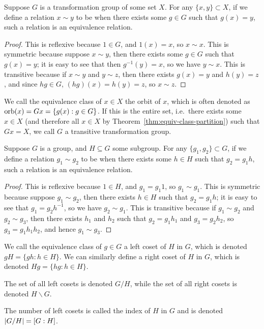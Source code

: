 \begin{proposition}
    Suppose \(G\) is a transformation group of some set \(X\).
    For any \(\{x,y\} \subset X\),
    if we define a relation \(x \sim y\) to be
    when there exists some \(g \in G\)
    such that \(g(x) = y\),
    such a relation is an equivalence relation.
\end{proposition}
\begin{proof}
    This is reflexive because \(1 \in G\),
    and \(1(x) = x\), so \(x \sim x\).
    This is symmetric because suppose \(x \sim y\),
    then there exists some \(g \in G\) such that \(g(x) = y\);
    it is easy to see that then \(g^{-1}(y) = x\),
    so we have \(y \sim x\).
    This is transitive because if \(x \sim y\) and \(y \sim z\),
    then there exists \(g(x) = y\) and \(h(y) = z\),
    and since \(hg \in G\), \((hg)(x) = h(y) = z\),
    so \(x \sim z\).
\end{proof}
\begin{definition}
    We call the equivalence class of \(x \in X\) the orbit of \(x\),
    which is often denoted as \(\operatorname{orb}(x) = Gx = \{g(x) : g \in G\}\).
    If this is the entire set,
    i.e.\ there exists some \(x \in X\)
    (and therefore all \(x \in X\) by Theorem~\ref{thm:equiv-class-partition})
    such that \(Gx = X\),
    we call \(G\) a transitive transformation group.
\end{definition}

\begin{proposition}
    Suppose \(G\) is a group, and \(H \subseteq G\) some subgroup.
    For any \(\{g_1,g_2\} \subset G\),
    if we define a relation \(g_1 \sim g_2\) to be
    when there exists some \(h \in H\) such that \(g_2 = g_1h\),
    such a relation is an equivalence relation.
\end{proposition}
\begin{proof}
    This is reflexive because \(1 \in H\),
    and \(g_1 = g_1 1\), so \(g_1 \sim g_1\).
    This is symmetric because suppose \(g_1 \sim g_2\),
    then there exists \(h \in H\) such that \(g_2 = g_1 h\);
    it is easy to see that \(g_1 = g_2 h^{-1}\), so we have \(g_2 \sim g_1\).
    This is transitive because if \(g_1 \sim g_2\) and \(g_2 \sim g_3\),
    then there exists \(h_1\) and \(h_2\) such that
    \(g_2 = g_1 h_1\) and \(g_3 = g_2 h_2\),
    so \(g_3 = g_1 h_1 h_2\),
    and hence \(g_1 \sim g_3\).
\end{proof}
\begin{definition}
    We call the equivalence class of \(g \in G\) a left coset of \(H\) in \(G\),
    which is denoted \(gH = \{gh : h \in H\}\).
    We can similarly define a right coset of \(H\) in \(G\),
    which is denoted \(Hg = \{hg : h \in H\}\).
\end{definition}
\begin{definition}
    The set of all left cosets is denoted \(G/H\),
    while the set of all right cosets is denoted \(H \backslash G\).
\end{definition}
\begin{definition}
    The number of left cosets is called the index of \(H\) in \(G\)
    and is denoted \(\abs{G/H} = [G:H]\).
\end{definition}

